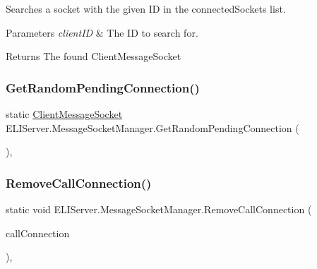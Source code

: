 Searches a socket with the given ID in the connected\+Sockets list. 


\begin{DoxyParams}{Parameters}
{\em client\+ID} & The ID to search for.\\
\hline
\end{DoxyParams}
\begin{DoxyReturn}{Returns}
The found Client\+Message\+Socket
\end{DoxyReturn}
\mbox{\label{class_e_l_i_server_1_1_message_socket_manager_a6988d1ee0c08ded66a3d428f04585716}} 
\subsubsection{\texorpdfstring{Get\+Random\+Pending\+Connection()}{GetRandomPendingConnection()}}
{\footnotesize\ttfamily static \hyperlink{class_e_l_i_server_1_1_messaging_1_1_client_message_socket}{Client\+Message\+Socket} E\+L\+I\+Server.\+Message\+Socket\+Manager.\+Get\+Random\+Pending\+Connection (\begin{DoxyParamCaption}{ }\end{DoxyParamCaption})\hspace{0.3cm}{\ttfamily [inline]}, {\ttfamily [static]}}

\mbox{\label{class_e_l_i_server_1_1_message_socket_manager_af591d88e97afd289dfd4f2d89713f5b2}} 
\subsubsection{\texorpdfstring{Remove\+Call\+Connection()}{RemoveCallConnection()}}
{\footnotesize\ttfamily static void E\+L\+I\+Server.\+Message\+Socket\+Manager.\+Remove\+Call\+Connection (\begin{DoxyParamCaption}\item[{\hyperlink{class_e_l_i_server_1_1_call_connection}{Call\+Connection}}]{call\+Connection }\end{DoxyParamCaption})\hspace{0.3cm}{\ttfamily [inline]}, {\ttfamily [static]}}

